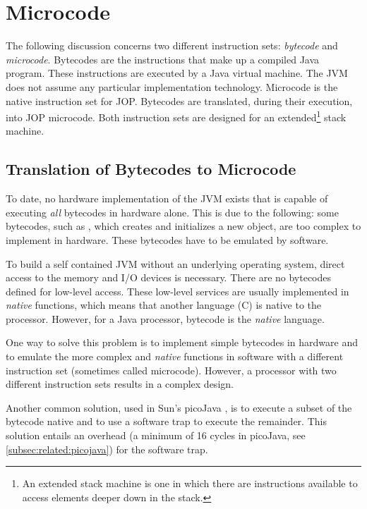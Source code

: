 \section{Microcode}
\label{sec:microcode}

The following discussion concerns two different instruction sets:
\emph{bytecode} and \emph{microcode}. Bytecodes are the instructions
that make up a compiled Java program. These instructions are
executed by a Java virtual machine. The JVM does not assume any
particular implementation technology. Microcode is the native
instruction set for JOP. Bytecodes are translated, during their
execution, into JOP microcode. Both instruction sets are designed
for an extended\footnote{An extended stack machine is one in which
there are instructions available to access elements deeper down in
the stack.} stack machine.

\subsection{Translation of Bytecodes to Microcode}

To date, no hardware implementation of the JVM exists that is
capable of executing \emph{all} bytecodes in hardware alone. This is
due to the following: some bytecodes, such as , which
creates and initializes a new object, are too complex to implement
in hardware. These bytecodes have to be emulated by software.

To build a self contained JVM without an underlying operating
system, direct access to the memory and I/O devices is necessary.
There are no bytecodes defined for low-level access. These low-level
services are usually implemented in \emph{native} functions, which
means that another language (C) is native to the processor. However,
for a Java processor, bytecode is the \emph{native} language.

One way to solve this problem is to implement simple bytecodes in
hardware and to emulate the more complex and \emph{native} functions
in software with a different instruction set (sometimes called
microcode). However, a processor with two different instruction sets
results in a complex design.

Another common solution, used in Sun's picoJava \cite{pjMicroArch},
is to execute a subset of the bytecode native and to use a software
trap to execute the remainder. This solution entails an overhead (a
minimum of 16 cycles in picoJava, see \ref{subsec:related:picojava})
for the software trap.

